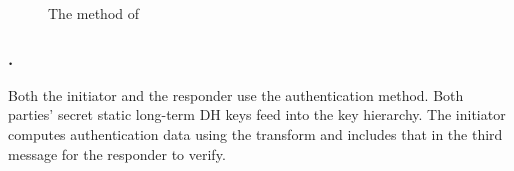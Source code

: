 \begin{figure}[h]
{}
\caption{The \mStatSig{} method of \mEdhoc}
\label{fig:edhocstatsig}
\end{figure}

\spacehack
\subsubsection{\mStatStat.}
Both the initiator and the responder use the \mStat{}
authentication method.
%
Both parties' secret static long-term DH keys feed into the key hierarchy.
%
The initiator computes authentication data using the \mAead{} transform
and includes that in the third message for the responder to verify.
%
%

